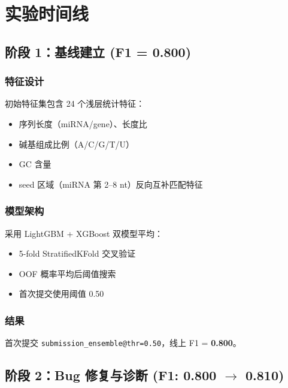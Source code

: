 \documentclass[11pt,a4paper]{article}
\begin{document}
\section{实验时间线}

\subsection{阶段 1：基线建立 (F1 = 0.800)}

\subsubsection{特征设计}

初始特征集包含 24 个浅层统计特征：

\begin{itemize}[nosep]
    \item 序列长度（miRNA/gene）、长度比
    \item 碱基组成比例（A/C/G/T/U）
    \item GC 含量
    \item seed 区域（miRNA 第 2--8 nt）反向互补匹配特征
\end{itemize}

\subsubsection{模型架构}

采用 LightGBM + XGBoost 双模型平均：
\begin{itemize}[nosep]
    \item 5-fold StratifiedKFold 交叉验证
    \item OOF 概率平均后阈值搜索
    \item 首次提交使用阈值 0.50
\end{itemize}

\subsubsection{结果}

首次提交 \texttt{submission\_ensemble@thr=0.50}，线上 F1 = \textbf{0.800}。

\subsection{阶段 2：Bug 修复与诊断 (F1: 0.800 $\to$ 0.810)}
\end{document}
